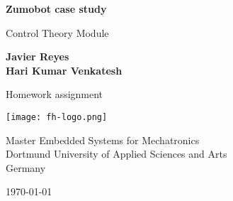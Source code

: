 \begin{titlepage}
  \begin{center}
    \vspace*{1cm}

    \Huge
    \textbf{Zumobot case study}

    \vspace{0.5cm}

    \LARGE
    {Control Theory Module}

    \vspace{3.5cm}

    \textbf{Javier Reyes\\
            Hari Kumar Venkatesh}

    \vfill

    {Homework assignment}

    \vspace{2cm}

    \texttt{[image: fh-logo.png]}

    \vspace{1cm}

    \Large
    {Master Embedded Systems for Mechatronics\\
    Dortmund University of Applied Sciences and Arts\\
    Germany}

    \vspace{0.5cm}

    \large
    {\today}

  \end{center}
\end{titlepage}
